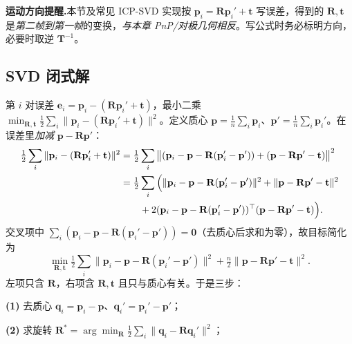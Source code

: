 \begin{note}
\textbf{运动方向提醒.}\;本节及常见 ICP-SVD 实现按 $\mathbf{p}_i=\mathbf{R}\mathbf{p}_i'+\mathbf{t}$ 写误差，得到的 $\mathbf{R},\mathbf{t}$ 是\emph{第二帧到第一帧}的变换，\emph{与本章 PnP/对极几何相反}\cite{gaoxiang2019slam14}。写公式时务必标明方向，必要时取逆 $\mathbf{T}^{-1}$。
\end{note}

\subsection{SVD 闭式解}
\label{sec:vo-icp-svd}

\begin{derivation}
\label{thm:vo-icp-svd}
第 $i$ 对误差 $\mathbf{e}_i=\mathbf{p}_i-(\mathbf{R}\mathbf{p}_i'+\mathbf{t})$，最小二乘 $\min_{\mathbf{R},\mathbf{t}}\tfrac12\sum_i\|\mathbf{p}_i-(\mathbf{R}\mathbf{p}_i'+\mathbf{t})\|^2$\cite{gaoxiang2019slam14}。定义质心 $\mathbf{p}=\tfrac1n\sum_i\mathbf{p}_i$、$\mathbf{p}'=\tfrac1n\sum_i\mathbf{p}_i'$。在误差里\emph{加减} $\mathbf{p}-\mathbf{R}\mathbf{p}'$：
\begin{align}
  \tfrac12\sum_i\|\mathbf{p}_i-(\mathbf{R}\mathbf{p}_i'+\mathbf{t})\|^2
  &=\tfrac12\sum_i\big\|(\mathbf{p}_i-\mathbf{p}-\mathbf{R}(\mathbf{p}_i'-\mathbf{p}'))+(\mathbf{p}-\mathbf{R}\mathbf{p}'-\mathbf{t})\big\|^2\notag\\
  &=\tfrac12\sum_i\Big(\|\mathbf{p}_i-\mathbf{p}-\mathbf{R}(\mathbf{p}_i'-\mathbf{p}')\|^2+\|\mathbf{p}-\mathbf{R}\mathbf{p}'-\mathbf{t}\|^2\notag\\
  &\qquad+2(\mathbf{p}_i-\mathbf{p}-\mathbf{R}(\mathbf{p}_i'-\mathbf{p}'))^\top(\mathbf{p}-\mathbf{R}\mathbf{p}'-\mathbf{t})\Big).
  \label{eq:vo-icp-expand}
\end{align}
交叉项中 $\sum_i(\mathbf{p}_i-\mathbf{p}-\mathbf{R}(\mathbf{p}_i'-\mathbf{p}'))=\mathbf{0}$（去质心后求和为零），故目标简化为
\begin{equation}
  \min_{\mathbf{R},\mathbf{t}}\tfrac12\sum_i\|\mathbf{p}_i-\mathbf{p}-\mathbf{R}(\mathbf{p}_i'-\mathbf{p}')\|^2+\tfrac{n}{2}\|\mathbf{p}-\mathbf{R}\mathbf{p}'-\mathbf{t}\|^2.
  \label{eq:vo-icp-split}
\end{equation}
左项只含 $\mathbf{R}$，右项含 $\mathbf{R},\mathbf{t}$ 且只与质心有关。于是三步：

\textbf{(1)} 去质心 $\mathbf{q}_i=\mathbf{p}_i-\mathbf{p}$、$\mathbf{q}_i'=\mathbf{p}_i'-\mathbf{p}'$；

\textbf{(2)} 求旋转 $\mathbf{R}^*=\arg\min_{\mathbf{R}}\tfrac12\sum_i\|\mathbf{q}_i-\mathbf{R}\mathbf{q}_i'\|^2$；


\end{derivation}
